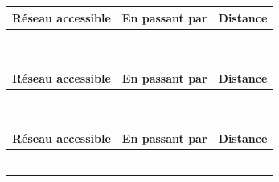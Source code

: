 \documentclass[a4paper,11pt]{article}
\begin{document}



\vspace{2.3cm}



\vspace{1.3cm}



\begin{center}
\renewcommand{\arraystretch}{1.5}
\begin{tabular}{|c|c|c|}
\hline 
\textbf{Réseau accessible} & \textbf{En passant par}  &	\textbf{Distance}  \tabularnewline
\hline
 &  &  \tabularnewline
\hline
 &  &  \tabularnewline
\hline
 &  &  \tabularnewline
\hline
 &  &  \tabularnewline
\hline
 &  &  \tabularnewline
\hline
 &  &  \tabularnewline
\hline
\end{tabular}

\end{center}




\begin{center}
\renewcommand{\arraystretch}{1.5}
\begin{tabular}{|c|c|c|}
\hline 
\textbf{Réseau accessible} & \textbf{En passant par}  &	\textbf{Distance}  \tabularnewline
\hline
 &  &  \tabularnewline
\hline
 &  &  \tabularnewline
\hline
 &  &  \tabularnewline
\hline
 &  &  \tabularnewline
\hline
 &  &  \tabularnewline
\hline
 &  &  \tabularnewline
\hline
\end{tabular}

\end{center}



\begin{center}
\renewcommand{\arraystretch}{1.5}
\begin{tabular}{|c|c|c|}
\hline 
\textbf{Réseau accessible} & \textbf{En passant par}  &	\textbf{Distance}  \tabularnewline
\hline
 &  &  \tabularnewline
\hline
 &  &  \tabularnewline
\hline
 &  &  \tabularnewline
\hline
 &  &  \tabularnewline
\hline
 &  &  \tabularnewline
\hline
 &  &  \tabularnewline
\hline
\end{tabular}

\end{center}
\end{document}
